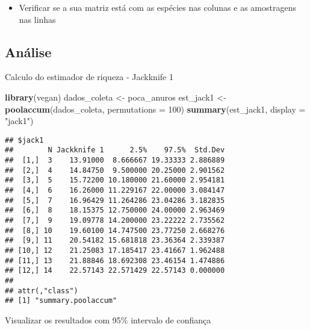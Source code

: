 \documentclass[
]{book}
\newenvironment{Shaded}{\begin{snugshade}}{\end{snugshade}}
\newcommand{\DataTypeTok}[1]{\textcolor[rgb]{0.13,0.29,0.53}{#1}}
\newcommand{\DecValTok}[1]{\textcolor[rgb]{0.00,0.00,0.81}{#1}}
\newcommand{\KeywordTok}[1]{\textcolor[rgb]{0.13,0.29,0.53}{\textbf{#1}}}
\newcommand{\NormalTok}[1]{#1}
\newcommand{\StringTok}[1]{\textcolor[rgb]{0.31,0.60,0.02}{#1}}
\providecommand{\tightlist}{%
  \setlength{\itemsep}{0pt}\setlength{\parskip}{0pt}}
\begin{document}
\begin{itemize}
\tightlist
\item
  Verificar se a sua matriz está com as espécies nas colunas e as amostragens nas linhas
\end{itemize}

\hypertarget{anuxe1lise-3}{%
\subsection{Análise}\label{anuxe1lise-3}}

Calculo do estimador de riqueza - Jackknife 1

\begin{Shaded}
\begin{Highlighting}[]
\KeywordTok{library}\NormalTok{(vegan)}
\NormalTok{dados_coleta <-}\StringTok{ }\NormalTok{poca_anuros}
\NormalTok{est_jack1 <-}\StringTok{ }\KeywordTok{poolaccum}\NormalTok{(dados_coleta, }\DataTypeTok{permutations =} \DecValTok{100}\NormalTok{)}
\KeywordTok{summary}\NormalTok{(est_jack1, }\DataTypeTok{display =} \StringTok{"jack1"}\NormalTok{)}
\end{Highlighting}
\end{Shaded}

\begin{verbatim}
## $jack1
##        N Jackknife 1      2.5%    97.5%  Std.Dev
##  [1,]  3    13.91000  8.666667 19.33333 2.886889
##  [2,]  4    14.84750  9.500000 20.25000 2.901562
##  [3,]  5    15.72200 10.180000 21.60000 2.954181
##  [4,]  6    16.26000 11.229167 22.00000 3.084147
##  [5,]  7    16.96429 11.264286 23.04286 3.182835
##  [6,]  8    18.15375 12.750000 24.00000 2.963469
##  [7,]  9    19.09778 14.200000 23.22222 2.735562
##  [8,] 10    19.60100 14.747500 23.77250 2.668276
##  [9,] 11    20.54182 15.681818 23.36364 2.339387
## [10,] 12    21.25083 17.185417 23.41667 1.962488
## [11,] 13    21.88846 18.692308 23.46154 1.474886
## [12,] 14    22.57143 22.571429 22.57143 0.000000
## 
## attr(,"class")
## [1] "summary.poolaccum"
\end{verbatim}

Visualizar os resultados com 95\% intervalo de confiança
\end{document}
